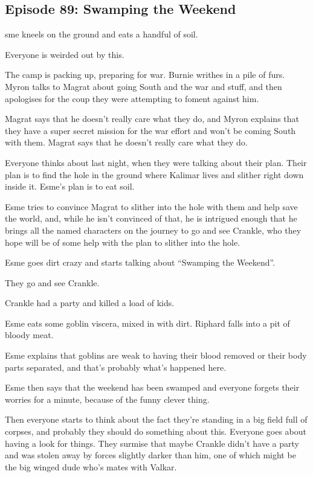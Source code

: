 \subsection{Episode 89: Swamping the Weekend}

sme kneels on the ground and eats a handful of soil.\medskip

Everyone is weirded out by this.\medskip

The camp is packing up, preparing for war. Burnie writhes in a pile of furs. Myron talks to Magrat about going South and the war and stuff, and then apologises for the coup they were attempting to foment against him.\medskip

Magrat says that he doesn’t really care what they do, and Myron explains that they have a super secret mission for the war effort and won’t be coming South with them. Magrat says that he doesn’t really care what they do.\medskip

Everyone thinks about last night, when they were talking about their plan. Their plan is to find the hole in the ground where Kalimar lives and slither right down inside it. Esme’s plan is to eat soil.\medskip

Esme tries to convince Magrat to slither into the hole with them and help save the world, and, while he isn’t convinced of that, he is intrigued enough that he brings all the named characters on the journey to go and see Crankle, who they hope will be of some help with the plan to slither into the hole.\medskip

Esme goes dirt crazy and starts talking about “Swamping the Weekend”.\medskip

They go and see Crankle.\medskip

Crankle had a party and killed a load of kids.\medskip

Esme eats some goblin viscera, mixed in with dirt. Riphard falls into a pit of bloody meat.\medskip

Esme explains that goblins are weak to having their blood removed or their body parts separated, and that’s probably what’s happened here.\medskip

Esme then says that the weekend has been swamped and everyone forgets their worries for a minute, because of the funny clever thing.\medskip

Then everyone starts to think about the fact they’re standing in a big field full of corpses, and probably they should do something about this. Everyone goes about having a look for things. They surmise that maybe Crankle didn’t have a party and was stolen away by forces slightly darker than him, one of which might be the big winged dude who’s mates with Valkar.\medskip

